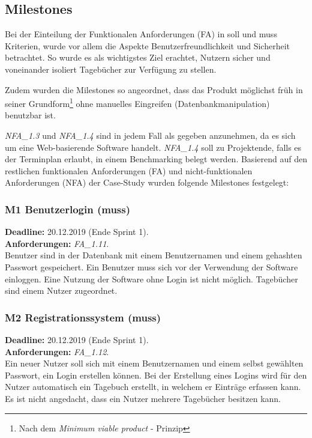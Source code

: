 \subsection{Milestones}
Bei der Einteilung der Funktionalen Anforderungen (FA) in soll und muss Kriterien, wurde vor allem die Aspekte Benutzerfreundlichkeit und Sicherheit betrachtet. So wurde es als wichtigstes Ziel erachtet, Nutzern sicher und voneinander isoliert Tagebücher zur Verfügung zu stellen.

Zudem wurden die Milestones so angeordnet, dass das Produkt möglichst früh in seiner Grundform\footnote{Nach dem \emph{Minimum viable product} - Prinzip} ohne manuelles Eingreifen (Datenbankmanipulation) benutzbar ist.

\emph{NFA\_1.3} und \emph{NFA\_1.4} sind in jedem Fall als gegeben anzunehmen, da es sich um eine Web-basierende Software handelt. \emph{NFA\_1.4} soll zu Projektende, falls es der Terminplan erlaubt, in einem Benchmarking belegt werden. Basierend auf den restlichen funktionalen Anforderungen (FA) und nicht-funktionalen Anforderungen (NFA) der Case-Study wurden folgende Milestones festgelegt:

\subsubsection{M1 Benutzerlogin (muss)}
\textbf{Deadline: } 20.12.2019 (Ende Sprint 1). \\
\textbf{Anforderungen: }\emph{FA\_1.11}.\\
Benutzer sind in der Datenbank mit einem Benutzernamen und einem gehashten Passwort gespeichert. Ein Benutzer muss sich vor der Verwendung der Software einloggen. Eine Nutzung der Software ohne Login ist nicht möglich. Tagebücher sind einem Nutzer zugeordnet.

\subsubsection{M2 Registrationssystem (muss)}
\textbf{Deadline: } 20.12.2019 (Ende Sprint 1). \\
\textbf{Anforderungen: }\emph{FA\_1.12}.\\
Ein neuer Nutzer soll sich mit einem Benutzernamen und einem selbst gewählten Passwort, ein Login erstellen können. Bei der Erstellung eines Logins wird für den Nutzer automatisch ein Tagebuch erstellt, in welchem er Einträge erfassen kann. Es ist nicht angedacht, dass ein Nutzer mehrere Tagebücher besitzen kann.

